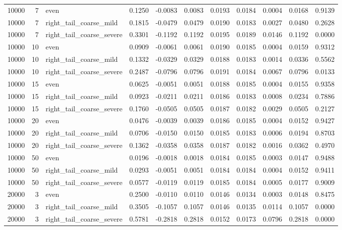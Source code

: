 \begin{table}[!h]
{\begin{tabular}[t]{rrlrrrrrrrr}
10000 & 7 & even & 0.1250 & -0.0083 & 0.0083 & 0.0193 & 0.0184 & 0.0004 & 0.0168 & 0.9139\\
10000 & 7 & right\_tail\_coarse\_mild & 0.1815 & -0.0479 & 0.0479 & 0.0190 & 0.0183 & 0.0027 & 0.0480 & 0.2628\\
10000 & 7 & right\_tail\_coarse\_severe & 0.3301 & -0.1192 & 0.1192 & 0.0195 & 0.0189 & 0.0146 & 0.1192 & 0.0000\\
10000 & 10 & even & 0.0909 & -0.0061 & 0.0061 & 0.0190 & 0.0185 & 0.0004 & 0.0159 & 0.9312\\
10000 & 10 & right\_tail\_coarse\_mild & 0.1332 & -0.0329 & 0.0329 & 0.0188 & 0.0183 & 0.0014 & 0.0336 & 0.5562\\
10000 & 10 & right\_tail\_coarse\_severe & 0.2487 & -0.0796 & 0.0796 & 0.0191 & 0.0184 & 0.0067 & 0.0796 & 0.0133\\
10000 & 15 & even & 0.0625 & -0.0051 & 0.0051 & 0.0188 & 0.0185 & 0.0004 & 0.0155 & 0.9358\\
10000 & 15 & right\_tail\_coarse\_mild & 0.0923 & -0.0211 & 0.0211 & 0.0186 & 0.0183 & 0.0008 & 0.0234 & 0.7886\\
10000 & 15 & right\_tail\_coarse\_severe & 0.1760 & -0.0505 & 0.0505 & 0.0187 & 0.0182 & 0.0029 & 0.0505 & 0.2127\\
10000 & 20 & even & 0.0476 & -0.0039 & 0.0039 & 0.0186 & 0.0185 & 0.0004 & 0.0152 & 0.9427\\
10000 & 20 & right\_tail\_coarse\_mild & 0.0706 & -0.0150 & 0.0150 & 0.0185 & 0.0183 & 0.0006 & 0.0194 & 0.8703\\
10000 & 20 & right\_tail\_coarse\_severe & 0.1362 & -0.0358 & 0.0358 & 0.0187 & 0.0182 & 0.0016 & 0.0362 & 0.4970\\
10000 & 50 & even & 0.0196 & -0.0018 & 0.0018 & 0.0184 & 0.0185 & 0.0003 & 0.0147 & 0.9488\\
10000 & 50 & right\_tail\_coarse\_mild & 0.0293 & -0.0051 & 0.0051 & 0.0184 & 0.0184 & 0.0004 & 0.0152 & 0.9411\\
10000 & 50 & right\_tail\_coarse\_severe & 0.0577 & -0.0119 & 0.0119 & 0.0185 & 0.0184 & 0.0005 & 0.0177 & 0.9009\\
20000 & 3 & even & 0.2500 & -0.0110 & 0.0110 & 0.0146 & 0.0134 & 0.0003 & 0.0148 & 0.8475\\
20000 & 3 & right\_tail\_coarse\_mild & 0.3505 & -0.1057 & 0.1057 & 0.0146 & 0.0135 & 0.0114 & 0.1057 & 0.0000\\
20000 & 3 & right\_tail\_coarse\_severe & 0.5781 & -0.2818 & 0.2818 & 0.0152 & 0.0173 & 0.0796 & 0.2818 & 0.0000\\

\end{tabular}}
\end{table}
